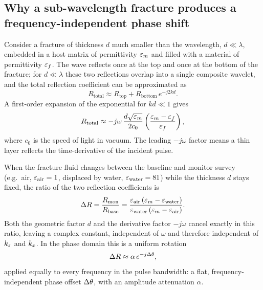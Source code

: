 \subsection{Why a sub-wavelength fracture produces a frequency-independent phase shift}

Consider a fracture of thickness $d$ much smaller than the wavelength,
$d\ll\lambda$, embedded in a host matrix of permittivity $\varepsilon_m$ and filled
with a material of permittivity $\varepsilon_f$. The wave reflects once at the top
and once at the bottom of the fracture; for $d \ll \lambda$ these two
reflections overlap into a single composite wavelet, and the total
reflection coefficient can be approximated as
\begin{equation}
  R_{\mathrm{total}} \approx R_{\mathrm{top}} + R_{\mathrm{bottom}}\, e^{-j2kd}.
  \label{eq:thinlayer-1}
\end{equation}
A first-order expansion of the exponential for $kd \ll 1$ gives
\begin{equation}
  R_{\mathrm{total}} \approx -j\omega\, \frac{d\sqrt{\varepsilon_m}}{2c_0}
    \left(\frac{\varepsilon_m - \varepsilon_f}{\varepsilon_f}\right),
  \label{eq:thinlayer-2}
\end{equation}
where $c_0$ is the speed of light in vacuum. The leading $-j\omega$ factor
means a thin layer reflects the time-derivative of the incident pulse.

When the fracture fluid changes between the baseline and monitor survey
(e.g.\ air, $\varepsilon_{\mathrm{air}}=1$, displaced by water, $\varepsilon_{\mathrm{water}}=81$)
while the thickness $d$ stays fixed, the ratio of the two reflection
coefficients is
\begin{equation}
  \Delta R = \frac{R_{\mathrm{mon}}}{R_{\mathrm{base}}}
  = \frac{\varepsilon_{\mathrm{air}}\,(\varepsilon_m - \varepsilon_{\mathrm{water}})}
         {\varepsilon_{\mathrm{water}}\,(\varepsilon_m - \varepsilon_{\mathrm{air}})} .
  \label{eq:thinlayer-ratio}
\end{equation}
Both the geometric factor $d$ and the derivative factor $-j\omega$ cancel
exactly in this ratio, leaving a complex constant, independent of $\omega$
and therefore independent of $k_z$ and $k_x$. In the phase domain this is a
uniform rotation
\begin{equation}
  \Delta R \approx \alpha\, e^{-j\Delta \theta},
  \label{eq:thinlayer-phase}
\end{equation}
applied equally to every frequency in the pulse bandwidth: a flat,
frequency-independent phase offset $\Delta \theta$, with an amplitude attenuation
$\alpha$.

